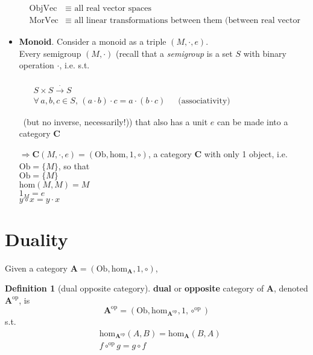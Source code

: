 \documentclass[twoside,landscape,10pt]{amsart}
\theoremstyle{plain}
\theoremstyle{definition}
\newtheorem{definition}{Definition}
\theoremstyle{remark}
\begin{document}
\begin{multicols*}{2}
\begin{itemize}
\[
\begin{aligned}
  & \text{Obj}\text{Vec} & \equiv \text{ all real vector spaces } \\ 
  & \text{Mor}\text{Vec} & \equiv \text{ all linear transformations between them (between real vector spaces) }
\end{aligned}
\]

\item \textbf{Monoid}.  Consider a monoid as a triple $(M, \cdot, e)$.  \\
Every semigroup $(M,\cdot)$ (recall that a \emph{semigroup} is a set $S$ with binary operation $\cdot $, i.e. s.t.

 \quad \,  $\begin{aligned} & \quad \\
 & S\times S \xrightarrow{\cdot } S \\ 
  & \forall \, a,b ,c \in S, \, (a\cdot b)\cdot c = a\cdot (b\cdot c) \quad \, \text{ (associativity) } \end{aligned}$ 

\quad \, (but no inverse, necessarily!)) that also has a unit $e$ can be made into a category $\mathbf{C}$ 

$\Longrightarrow \mathbf{C}(M,\cdot ,e) = (\text{Ob}, \text{hom}, 1, \circ)$, a category $\mathbf{C}$ with only 1 object, i.e. $\text{Ob} = \lbrace M \rbrace$, so that \\
$\text{Ob} = \lbrace M \rbrace$ \\
$\text{hom}(M,M) = M$ \\
$1_M = e$ \\
$y \circ x = y \cdot x$
\end{itemize}

\section{Duality}

Given a category $\mathbf{A} = ( \text{Ob}, \text{hom}_{\mathbf{A}}, 1, \circ)$, 
\begin{definition}[dual opposite category]
\textbf{dual} or \textbf{opposite} category of $\mathbf{A}$, denoted $\mathbf{A}^{\text{op}}$, is   
\begin{equation}
\mathbf{A}^{\text{op}}  = (\text{Ob}, \text{hom}_{\mathbf{A}^{\text{op}}} , 1 , \circ^{\text{op}})
\end{equation}
s.t.
\[
\begin{aligned}
  & \text{hom}_{\mathbf{A}^{\text{op}}}(A,B) = \text{hom}_{\mathbf{A}}(B,A) \\ 
  & f\circ^{\text{op}} g = g \circ f
\end{aligned}
\]
\end{definition}


\end{multicols*}
\end{document}
